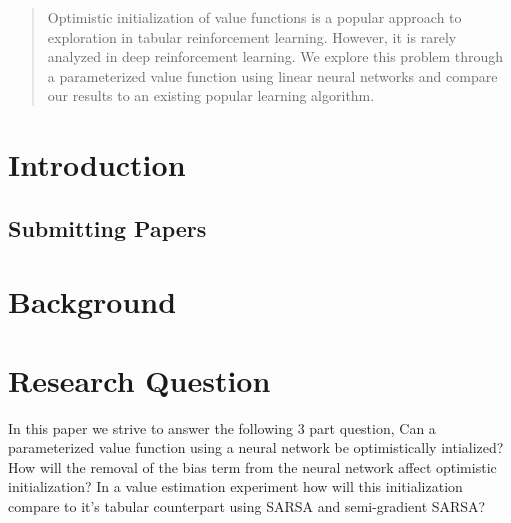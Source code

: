 \documentclass{article}
\theoremstyle{plain}
\theoremstyle{definition}
\theoremstyle{remark}
\begin{document}
\begin{abstract}
Optimistic initialization of value functions is a popular approach to exploration
in tabular reinforcement learning. However, it is rarely analyzed
in deep reinforcement learning. We explore this problem through a parameterized
value function using linear neural networks and compare our results to an existing popular 
learning algorithm.
\end{abstract}

\section{Introduction}

\subsection{Submitting Papers}

\medskip
\section{Background}


\section{Research Question}
In this paper we strive to answer the following 3 part question,
Can a parameterized value function using a neural network be optimistically intialized?
How will the removal of the bias term from the neural network affect optimistic initialization?
In a value estimation experiment how will this initialization compare to it's tabular counterpart using 
SARSA and semi-gradient SARSA?
\end{document}
